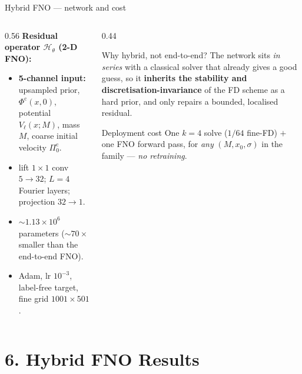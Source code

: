 \documentclass[aspectratio=169, 11pt]{beamer}
\begin{document}
\begin{frame}{Hybrid FNO --- network and cost}
  \begin{columns}[T]
    \begin{column}{0.56\textwidth}
      \textbf{Residual operator $\mathcal{H}_\theta$ (2-D FNO):}
      \begin{itemize}\small
        \item \textbf{5-channel input:} upsampled prior, $\Phi^{\mathrm{c}}(x,0)$,
              potential $V_\ell(x;M)$, mass $M$, coarse initial velocity $\Pi^{\mathrm{c}}_0$.
        \item lift $1{\times}1$ conv $5\!\to\!32$; \;$L\!=\!4$ Fourier layers;
              projection $32\!\to\!1$.
        \item $\sim\!1.13\times10^{6}$ parameters ($\sim\!70\times$ smaller than the
              end-to-end FNO).
        \item Adam, lr $10^{-3}$, label-free target, fine grid $1001\times501$.
      \end{itemize}
    \end{column}
    \begin{column}{0.44\textwidth}
      \begin{block}{\footnotesize Why hybrid, not end-to-end?}
        \footnotesize
        The network sits \emph{in series} with a classical solver that already gives a
        good guess, so it \textbf{inherits the stability and discretisation-invariance}
        of the FD scheme as a hard prior, and only repairs a bounded, localised residual.
      \end{block}
      \begin{block}{\footnotesize Deployment cost}
        \footnotesize
        One $k\!=\!4$ solve ($1/64$ fine-FD) $+$ one FNO forward pass, for \emph{any}
        $(M,x_0,\sigma)$ in the family --- \emph{no retraining}.
      \end{block}
    \end{column}
  \end{columns}
\end{frame}


\section{6. Hybrid FNO Results}
\end{document}
